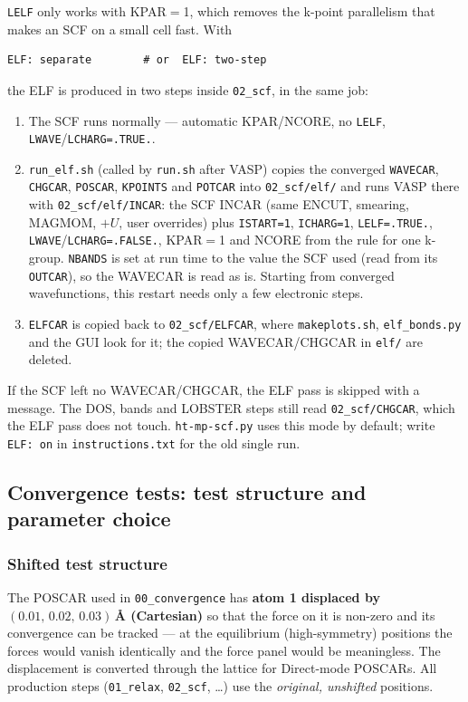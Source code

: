\documentclass[11pt,a4paper]{scrartcl}
\begin{document}
\texttt{LELF} only works with KPAR${}={}$1, which removes the k-point
parallelism that makes an SCF on a small cell fast.  With
\begin{lstlisting}
ELF: separate        # or  ELF: two-step
\end{lstlisting}
the ELF is produced in two steps inside \texttt{02\_scf}, in the same job:
\begin{enumerate}
\item The SCF runs normally --- automatic KPAR/NCORE, no \texttt{LELF},
  \texttt{LWAVE}/\texttt{LCHARG=.TRUE.}.
\item \texttt{run\_elf.sh} (called by \texttt{run.sh} after VASP) copies the
  converged \texttt{WAVECAR}, \texttt{CHGCAR}, \texttt{POSCAR},
  \texttt{KPOINTS} and \texttt{POTCAR} into \texttt{02\_scf/elf/} and runs
  VASP there with \texttt{02\_scf/elf/INCAR}: the SCF INCAR (same ENCUT,
  smearing, MAGMOM, $+U$, user overrides) plus \texttt{ISTART=1},
  \texttt{ICHARG=1}, \texttt{LELF=.TRUE.}, \texttt{LWAVE}/\texttt{LCHARG=.FALSE.},
  KPAR${}={}$1 and NCORE from the rule for one k-group.  \texttt{NBANDS} is
  set at run time to the value the SCF used (read from its \texttt{OUTCAR}),
  so the WAVECAR is read as is.  Starting from converged wavefunctions, this
  restart needs only a few electronic steps.
\item \texttt{ELFCAR} is copied back to \texttt{02\_scf/ELFCAR}, where
  \texttt{makeplots.sh}, \texttt{elf\_bonds.py} and the GUI look for it; the
  copied WAVECAR/CHGCAR in \texttt{elf/} are deleted.
\end{enumerate}
If the SCF left no WAVECAR/CHGCAR, the ELF pass is skipped with a message.
The DOS, bands and LOBSTER steps still read \texttt{02\_scf/CHGCAR}, which the
ELF pass does not touch.  \texttt{ht-mp-scf.py} uses this mode by default;
write \texttt{ELF: on} in \texttt{instructions.txt} for the old single run.

\subsection{Convergence tests: test structure and parameter choice}
\label{app:conv}

\subsubsection{Shifted test structure}

The POSCAR used in \texttt{00\_convergence} has \textbf{atom 1 displaced
by $(0.01,\,0.02,\,0.03)$\,\AA{} (Cartesian)} so that the force on it is
non-zero and its convergence can be tracked --- at the equilibrium
(high-symmetry) positions the forces would vanish identically and the
force panel would be meaningless.  The displacement is converted through
the lattice for Direct-mode POSCARs.  All production steps
(\texttt{01\_relax}, \texttt{02\_scf}, \dots) use the \emph{original,
unshifted} positions.
\end{document}
